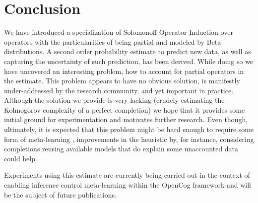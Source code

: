 \documentclass[runningheads]{llncs}
\begin{document}
\section{Conclusion}
\label{con}
We have introduced a specialization of Solomonoff Operator Induction
over operators with the particularities of being partial and modeled
by Beta distributions. A second order probability estimate to predict
new data, as well as capturing the uncertainty of such prediction, has
been derived. While doing so we have uncovered an interesting problem,
how to account for partial operators in the estimate. This problem
appears to have no obvious solution, is manifestly under-addressed by
the research community, and yet important in practice. Although the
solution we provide is very lacking (crudely estimating the Kolmogorov
complexity of a perfect completion) we hope that it provides some
initial ground for experimentation and motivates further research.
Even though, ultimately, it is expected that this problem might be
hard enough to require some form of meta-learning
\cite{Goertzel16Probabilistic}, improvements in the heuristic by, for
instance, considering completions reusing available models that do
explain some unaccounted data could help.

Experiments using this estimate are currently being carried out in the
context of enabling inference control meta-learning within the OpenCog
framework and will be the subject of future publications.

%
%


\end{document}
